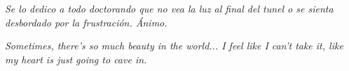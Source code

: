 
\begin{dedication} %

\textit{
Se lo dedico a todo doctorando que no vea la luz al final del tunel o se sienta desbordado por la frustración. Ánimo.
}


\emph{Sometimes, there's so much beauty in the world... I feel like I can't take it, like my heart is just going to cave in.}

\end{dedication}

